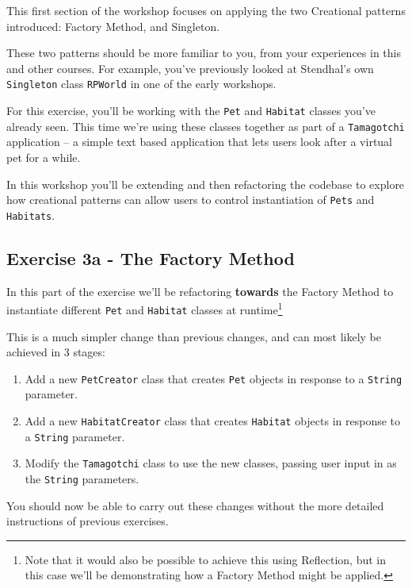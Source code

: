 \documentclass[
]{book}
\providecommand{\tightlist}{%
  \setlength{\itemsep}{0pt}\setlength{\parskip}{0pt}}
\begin{document}
This first section of the workshop focuses on applying the two Creational patterns introduced: Factory Method, and Singleton.

These two patterns should be more familiar to you, from your experiences in this and other courses. For example, you've previously looked at Stendhal's own \texttt{Singleton} class \texttt{RPWorld} in one of the early workshops.

For this exercise, you'll be working with the \texttt{Pet} and \texttt{Habitat} classes you've already seen. This time we're using these classes together as part of a \texttt{Tamagotchi} application -- a simple text based application that lets users look after a virtual pet for a while.

In this workshop you'll be extending and then refactoring the codebase to explore how creational patterns can allow users to control instantiation of \texttt{Pets} and \texttt{Habitats}.

\hypertarget{factory}{%
\subsection{Exercise 3a - The Factory Method}\label{factory}}

In this part of the exercise we'll be refactoring \textbf{towards} the Factory Method to instantiate different \texttt{Pet} and \texttt{Habitat} classes at runtime\footnote{Note that it would also be possible to achieve this using Reflection, but in this case we'll be demonstrating how a Factory Method might be applied.}

This is a much simpler change than previous changes, and can most likely be achieved in 3 stages:

\begin{enumerate}
\def\labelenumi{\arabic{enumi}.}
\tightlist
\item
  Add a new \texttt{PetCreator} class that creates \texttt{Pet} objects in response to a \texttt{String} parameter.
\item
  Add a new \texttt{HabitatCreator} class that creates \texttt{Habitat} objects in response to a \texttt{String} parameter.
\item
  Modify the \texttt{Tamagotchi} class to use the new classes, passing user input in as the \texttt{String} parameters.
\end{enumerate}

You should now be able to carry out these changes without the more detailed instructions of previous exercises.
\end{document}
